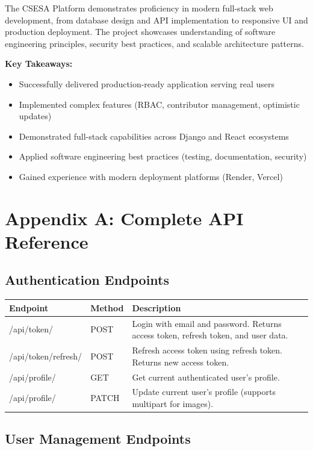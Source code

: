 \documentclass[11pt,a4paper]{article}
\begin{document}
The CSESA Platform demonstrates proficiency in modern full-stack web development, from database design and API implementation to responsive UI and production deployment. The project showcases understanding of software engineering principles, security best practices, and scalable architecture patterns.

\textbf{Key Takeaways:}
\begin{itemize}[leftmargin=*]
    \item Successfully delivered production-ready application serving real users
    \item Implemented complex features (RBAC, contributor management, optimistic updates)
    \item Demonstrated full-stack capabilities across Django and React ecosystems
    \item Applied software engineering best practices (testing, documentation, security)
    \item Gained experience with modern deployment platforms (Render, Vercel)
\end{itemize}

\section{Appendix A: Complete API Reference}

\subsection{Authentication Endpoints}

\begin{tabular}{|p{3cm}|p{3cm}|p{8cm}|}
\hline
\textbf{Endpoint} & \textbf{Method} & \textbf{Description} \\
\hline
/api/token/ & POST & Login with email and password. Returns access token, refresh token, and user data. \\
\hline
/api/token/refresh/ & POST & Refresh access token using refresh token. Returns new access token. \\
\hline
/api/profile/ & GET & Get current authenticated user's profile. \\
\hline
/api/profile/ & PATCH & Update current user's profile (supports multipart for images). \\
\hline
\end{tabular}

\subsection{User Management Endpoints}
\end{document}
